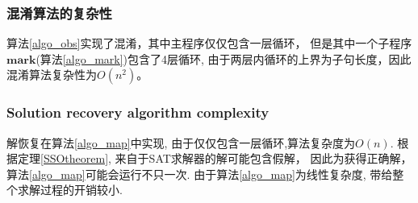 \subsubsection{混淆算法的复杂性}
算法\ref{algo_obs}实现了混淆，其中主程序仅仅包含一层循环，
但是其中一个子程序$\mathbf{mark}$(算法\ref{algo_mark})包含了4层循环,
由于两层内循环的上界为子句长度，因此混淆算法复杂性为$O(n^2)$。
\subsubsection{Solution recovery algorithm complexity}
解恢复在算法\ref{algo_map}中实现,
由于仅仅包含一层循环,算法复杂度为$O(n)$.
根据定理\ref{SSOtheorem}, 来自于SAT求解器的解可能包含假解，
因此为获得正确解，算法\ref{algo_map}可能会运行不只一次.
由于算法\ref{algo_map}为线性复杂度,
带给整个求解过程的开销较小.
%
